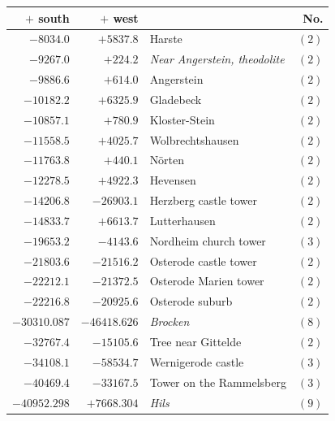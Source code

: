 \begin{center}\begingroup\fontsize{8}{9}\selectfont
\setlength{\tabcolsep}{4pt}
\begin{tabular}{r|r|p{170pt}|r}\hline
\(+\) south&\(+\) west&&No.\\\hline
\(-8034.0\)&\(+5837.8\)&Harste&\((2)\)\\
\(-9267.0\)&\(+224.2\)&\textit{Near Angerstein, theodolite}&\((2)\)\\
\(-9886.6\)&\(+614.0\)&Angerstein&\((2)\)\\
\(-10182.2\)&\(+6325.9\)&Gladebeck&\((2)\)\\
\(-10857.1\)&\(+780.9\)&Kloster-Stein&\((2)\)\\
\(-11558.5\)&\(+4025.7\)&Wolbrechtshausen&\((2)\)\\
\(-11763.8\)&\(+440.1\)&Nörten&\((2)\)\\
\(-12278.5\)&\(+4922.3\)&Hevensen&\((2)\)\\
\(-14206.8\)&\(-26903.1\)&Herzberg castle tower&\((2)\)\\
\(-14833.7\)&\(+6613.7\)&Lutterhausen&\((2)\)\\
\(-19653.2\)&\(-4143.6\)&Nordheim church tower&\((3)\)\\
\(-21803.6\)&\(-21516.2\)&Osterode castle tower&\((2)\)\\
\(-22212.1\)&\(-21372.5\)&Osterode Marien tower&\((2)\)\\
\(-22216.8\)&\(-20925.6\)&Osterode suburb&\((2)\)\\
\(-30310.087\)&\(-46418.626\)&\textit{Brocken}&\((8)\)\\
\(-32767.4\)&\(-15105.6\)&Tree near Gittelde&\((2)\)\\
\(-34108.1\)&\(-58534.7\)&Wernigerode castle&\((3)\)\\
\(-40469.4\)&\(-33167.5\)&Tower on the Rammelsberg&\((3)\)\\
\(-40952.298\)&\(+7668.304\)&\textit{Hils}&\((9)\)\\
\hline\end{tabular}\endgroup\end{center}
